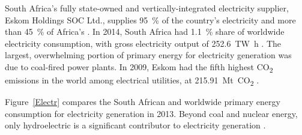 South Africa's fully state-owned and vertically-integrated electricity supplier, Eskom Holdings SOC Ltd., supplies \SI{95}{\percent} of the country's electricity and more than \SI{45}{\percent} of Africa's \cite{EskomGenerationDivision2014}. In 2014, South Africa had \SI{1.1}{\percent} share of worldwide electricity consumption, with gross electricity output of \SI{252.6}{\tera\watt\hour} \cite{BP2015c}.
The largest, overwhelming portion of primary energy for electricity generation was due to coal-fired power plants. In 2009, Eskom had the fifth highest CO\textsubscript{2} emissions in the world among electrical utilities, at \SI{215.91}{\mega\tonne}~CO\textsubscript{2} \cite{CARMA2015}.


Figure~\ref{Electr} compares the South African and worldwide primary energy consumption for electricity generation in 2013. Beyond coal and nuclear energy, only hydroelectric is a significant contributor to electricity generation \cite{Agency2015}.

